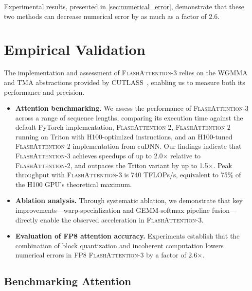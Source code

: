 \begin{enumerate}
\begin{algorithm}[H]
\begin{algorithmic}[1]
Experimental results, presented in \cref{sec:numerical_error}, demonstrate that these two methods can decrease numerical error by as much as a factor of 2.6.

\section{Empirical Validation}
\label{sec:exp}

The implementation and assessment of \textsc{FlashAttention-3} relies on the WGMMA and TMA abstractions provided by CUTLASS~\citep{Thakkar_CUTLASS_2023}, enabling us to measure both its performance and precision.

\begin{itemize}

\item \textbf{Attention benchmarking.} We assess the performance of \textsc{FlashAttention-3} across a range of sequence lengths, comparing its execution time against the default PyTorch implementation, \textsc{FlashAttention-2}, \textsc{FlashAttention-2} running on Triton with H100-optimized instructions, and an H100-tuned \textsc{FlashAttention-2} implementation from cuDNN. Our findings indicate that \textsc{FlashAttention-3} achieves speedups of up to 2.0$\times$ relative to \textsc{FlashAttention-2}, and outpaces the Triton variant by up to 1.5$\times$.
Peak throughput with \textsc{FlashAttention-3} is 740 TFLOPs/s, equivalent to 75\% of the H100 GPU’s theoretical maximum.
\item \textbf{Ablation analysis.} Through systematic ablation, we demonstrate that key improvements—warp-specialization and GEMM-softmax pipeline fusion—directly enable the observed acceleration in \textsc{FlashAttention-3}.
\item \textbf{Evaluation of FP8 attention accuracy.} Experiments establish that the combination of block quantization and incoherent computation lowers numerical errors in FP8 \textsc{FlashAttention-3} by a factor of 2.6$\times$.
\end{itemize}

\subsection{Benchmarking Attention}
\label{subsec:benchmark_attn}


\end{algorithmic}
\end{algorithm}
\end{enumerate}

